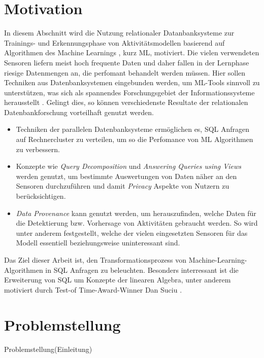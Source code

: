\section*{Motivation}

In diesem Abschnitt wird die Nutzung relationaler Datanbanksysteme zur Trainings- und Erkennungsphase von Aktivitätsmodellen 
basierend auf Algorithmen des Machine Learnings \cite{anzai2012pattern}, kurz ML, motiviert.
Die vielen verwendeten Sensoren liefern meist hoch frequente Daten und daher fallen in der Lernphase riesige Datenmengen an, die perfomant behandelt werden müssen.
Hier sollen Techniken aus Datenbanksystemen eingebunden werden, um ML-Tools sinnvoll zu unterstützen, was sich als spannendes Forschungsgebiet der Informationssysteme herausstellt \cite{abiteboul2018research}.
Gelingt dies, so können verschiedenste Resultate der relationalen Datenbankforschung vorteilhaft genutzt werden.
\begin{itemize}
    \item Techniken der parallelen Datenbanksysteme ermöglichen es, SQL Anfragen auf Rechnercluster zu verteilen, um so die Perfomance von ML Algorithmen zu verbessern.
    \item Konzepte wie \textit{Query Decomposition} \cite{chirkova2011materialized} und \textit{Answering Queries using Views} \cite{ afrati2019answering, levy1999answering} werden genutzt, um bestimmte Auswertungen von Daten näher an den Sensoren durchzuführen und damit \textit{Privacy} \cite{agrawal2000privacy} Aspekte von Nutzern zu berücksichtigen.
    \item \textit{Data Provenance} \cite{heuer2015metis, bruder2017konzepte} kann genutzt werden, um herauszufinden, welche Daten für die Detektierung bzw. Vorhersage von Aktivitäten gebraucht werden. 
    So wird unter anderem festgestellt, welche der vielen eingesetzten Sensoren für das Modell essentiell beziehungsweise uninteressant sind.
\end{itemize} 
Das Ziel dieser Arbeit ist, den Transformationsprozess von Machine-Learning-Algorithmen in SQL Anfragen zu beleuchten. Besonders interressant ist die Erweiterung von SQL um Konzepte der linearen Algebra, unter anderem motiviert durch Test-of Time-Award-Winner Dan Suciu \cite{interviewsuciu} .


\section*{Problemstellung}
Problemstellung(Einleitung)

